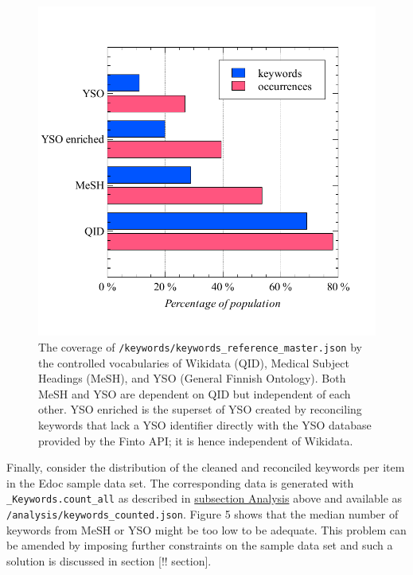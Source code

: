 \begin{figure}
\centering
\includegraphics{images/native_gold_standard.pdf}
\caption{The coverage of
\texttt{/keywords/keywords\_reference\_master.json} by the controlled
vocabularies of Wikidata (QID), Medical Subject Headings (MeSH), and YSO
(General Finnish Ontology). Both MeSH and YSO are dependent on QID but
independent of each other. YSO enriched is the superset of YSO created
by reconciling keywords that lack a YSO identifier directly with the YSO
database provided by the Finto API; it is hence independent of
Wikidata.}
\end{figure}

Finally, consider the distribution of the cleaned and reconciled
keywords per item in the Edoc sample data set. The corresponding data is
generated with \texttt{\_Keywords.count\_all} as described in
\protect\hyperlink{analysis}{subsection Analysis} above and available as
\texttt{/analysis/keywords\_counted.json}. Figure 5 shows that the
median number of keywords from MeSH or YSO might be too low to be
adequate. This problem can be amended by imposing further constraints on
the sample data set and such a solution is discussed in section {[}!!
section{]}.


